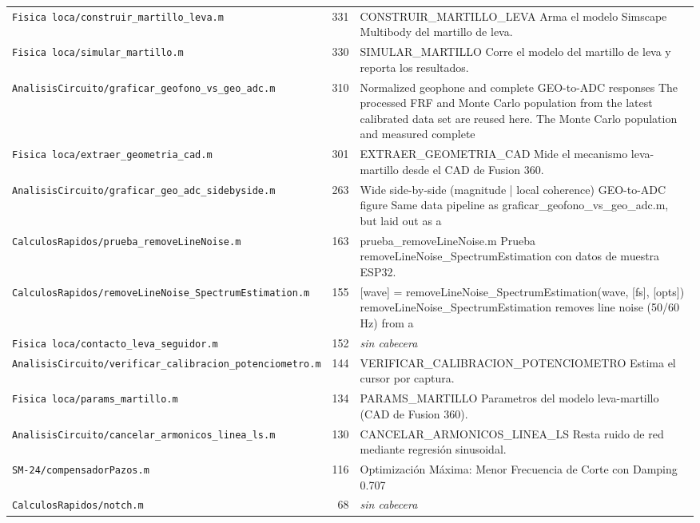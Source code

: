 \begin{longtable}{@{}p{5.4cm} r p{8.6cm}@{}}
\texttt{\scriptsize Fisica loca/construir\_martillo\_leva.m} & 331 & CONSTRUIR\_MARTILLO\_LEVA Arma el modelo Simscape Multibody del martillo de leva. \\
\texttt{\scriptsize Fisica loca/simular\_martillo.m} & 330 & SIMULAR\_MARTILLO Corre el modelo del martillo de leva y reporta los resultados. \\
\texttt{\scriptsize AnalisisCircuito/graficar\_geofono\_vs\_geo\_adc.m} & 310 & Normalized geophone and complete GEO-to-ADC responses The processed FRF and Monte Carlo population from the latest calibrated data set are reused here. The Monte Carlo population and measured complete \\
\texttt{\scriptsize Fisica loca/extraer\_geometria\_cad.m} & 301 & EXTRAER\_GEOMETRIA\_CAD Mide el mecanismo leva-martillo desde el CAD de Fusion 360. \\
\texttt{\scriptsize AnalisisCircuito/graficar\_geo\_adc\_sidebyside.m} & 263 & Wide side-by-side (magnitude | local coherence) GEO-to-ADC figure Same data pipeline as graficar\_geofono\_vs\_geo\_adc.m, but laid out as a \\
\texttt{\scriptsize CalculosRapidos/prueba\_removeLineNoise.m} & 163 & prueba\_removeLineNoise.m Prueba removeLineNoise\_SpectrumEstimation con datos de muestra ESP32. \\
\texttt{\scriptsize CalculosRapidos/removeLineNoise\_SpectrumEstimation.m} & 155 & [wave] = removeLineNoise\_SpectrumEstimation(wave, [fs], [opts]) removeLineNoise\_SpectrumEstimation removes line noise (50/60 Hz) from a \\
\texttt{\scriptsize Fisica loca/contacto\_leva\_seguidor.m} & 152 & \textit{sin cabecera} \\
\texttt{\scriptsize AnalisisCircuito/verificar\_calibracion\_potenciometro.m} & 144 & VERIFICAR\_CALIBRACION\_POTENCIOMETRO Estima el cursor por captura. \\
\texttt{\scriptsize Fisica loca/params\_martillo.m} & 134 & PARAMS\_MARTILLO Parametros del modelo leva-martillo (CAD de Fusion 360). \\
\texttt{\scriptsize AnalisisCircuito/cancelar\_armonicos\_linea\_ls.m} & 130 & CANCELAR\_ARMONICOS\_LINEA\_LS Resta ruido de red mediante regresión sinusoidal. \\
\texttt{\scriptsize SM-24/compensadorPazos.m} & 116 & Optimización Máxima: Menor Frecuencia de Corte con Damping 0.707 \\
\texttt{\scriptsize CalculosRapidos/notch.m} & 68 & \textit{sin cabecera} \\

\end{longtable}
